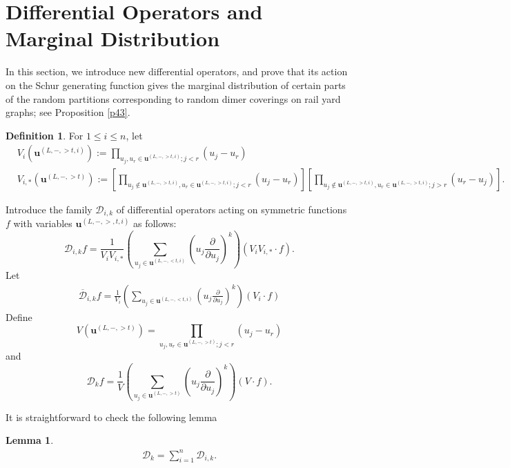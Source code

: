 \documentclass[11pt]{amsart}
\theoremstyle{plain}
\newtheorem{lemma}[theorem]{Lemma}
\theoremstyle{definition}
\newtheorem{definition}[theorem]{Definition}
\theoremstyle{remark}
\newcommand\ol{\overline}
\numberwithin{equation}{section}
\numberwithin{theorem}{section}
\numberwithin{figure}{section}
\begin{document}
\section{Differential Operators and Marginal Distribution}\label{sect:md}

In this section, we introduce new differential operators, and prove that its action on the Schur generating function gives the marginal distribution of certain parts of the random partitions corresponding to random dimer coverings on rail yard graphs; see Proposition \ref{p43}.

\begin{definition}For $1\leq i\leq n$, let  
\begin{align*}
&V_i(\mathbf{u}^{(L,-,>t,i)}):=\prod_{u_{j},u_r\in \mathbf{u}^{(L,-,>t,i)};j<r}(u_j-u_r)\\
&V_{i,*}(\mathbf{u}^{(L,-,>t)}):=\left[\prod_{u_{j}\notin \mathbf{u}^{(L,-,>t,i)},u_r\in \mathbf{u}^{(L,-,>t,i)};j<r}(u_j-u_r)\right]\left[\prod_{u_{j}\notin \mathbf{u}^{(L,-,>t,i)},u_r\in \mathbf{u}^{(L,-,>t,i)};j>r}(u_r-u_j)\right].
\end{align*}

Introduce the family $\mathcal{D}_{i,k}$ of differential operators acting on
symmetric functions $f$ with variables $\mathbf{u}^{(L,-,>,t,i)}$ as follows:
\begin{equation}
\mathcal{D}_{i,k} f=\frac{1}{V_iV_{i,*}}\left(\sum_{u_j\in\mathbf{u}^{(L,-,<t,i)}}\left(u_j\frac{\partial}{\partial
u_j}\right)^k\right)(V_iV_{i,*}\cdot f)\label{dki}.
\end{equation}
Let 
\begin{align*}
\ol{\mathcal{D}}_{i,k}f=\frac{1}{V_i}\left(\sum_{u_j\in\mathbf{u}^{(L,-,<t,i)}}\left(u_j\frac{\partial}{\partial
u_j}\right)^k\right)(V_i\cdot f)
\end{align*}
Define
\begin{equation*}
V(\mathbf{u}^{(L,-,>t)})=\prod_{u_{j},u_r\in \mathbf{u}^{(L,-,>t)};j<r}(u_j-u_r)
\end{equation*}
and 
\begin{equation}
\mathcal{D}_{k} f=\frac{1}{V}\left(\sum_{u_j\in\mathbf{u}^{(L,-,>t)}}\left(u_j\frac{\partial}{\partial
u_j}\right)^k\right)(V\cdot f)\label{dk}.
\end{equation}
\end{definition}
It is straightforward to check the following lemma
\begin{lemma}\label{le52}
\begin{align*}
\mathcal{D}_k=\sum_{i=1}^n\mathcal{D}_{i,k}.
\end{align*}
\end{lemma}
\end{document}
